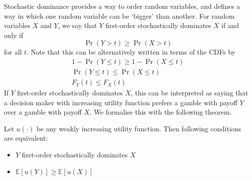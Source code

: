 \documentclass[11pt]{report} %
\begin{document}
Stochastic dominance provides a way to order random variables, and defines a way in which one random variable can be `bigger' than another. For random variables $X$ and $Y$, we say that $Y$ first-order stochastically dominates $X$ if and only if
\begin{equation}
\operatorname{Pr}\left(Y > t\right) \geq \operatorname{Pr}\left(X > t\right)
\end{equation}
for all $t$. Note that this can be alternatively written in terms of the CDFs by
\begin{gather}
1 - \operatorname{Pr}\left(Y \leq t\right) \geq 1 - \operatorname{Pr}\left(X \leq t\right) \\
\operatorname{Pr}\left(Y \leq t\right) \leq \operatorname{Pr}\left(X \leq t\right) \\
F_{Y}\left(t\right) \leq F_{X}\left(t\right)
\end{gather}
If $Y$ first-order stochastically dominates $X$, this can be interpreted as saying that a decision maker with increasing utility function prefers a gamble with payoff $Y$ over a gamble with payoff $X$. We formalise this with the following theorem.
\begin{theorem}
Let $u\left(\cdot\right)$ be any weakly increasing utility function. Then following conditions are equivalent:
\begin{itemize}
\item $Y$ first-order stochastically dominates $X$
\item $\mathbb{E}\left[u\left(Y\right)\right] \geq \mathbb{E}\left[u\left(X\right)\right]$
\end{itemize}
\end{theorem}
\end{document}
